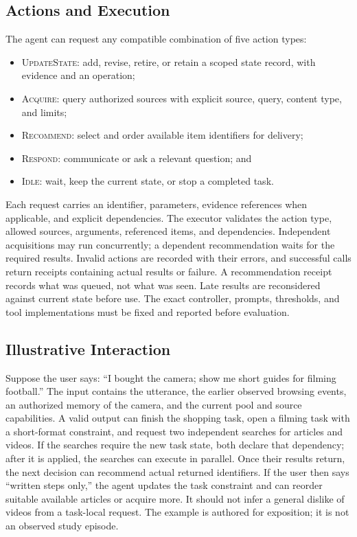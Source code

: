 \documentclass[11pt]{article}
\begin{document}
\subsection{Actions and Execution}
The agent can request any compatible combination of five action types:
\begin{itemize}
\item \textsc{UpdateState}: add, revise, retire, or retain a scoped state record, with evidence and an operation;
\item \textsc{Acquire}: query authorized sources with explicit source, query, content type, and limits;
\item \textsc{Recommend}: select and order available item identifiers for delivery;
\item \textsc{Respond}: communicate or ask a relevant question; and
\item \textsc{Idle}: wait, keep the current state, or stop a completed task.
\end{itemize}
Each request carries an identifier, parameters, evidence references when applicable, and explicit dependencies. The executor validates the action type, allowed sources, arguments, referenced items, and dependencies. Independent acquisitions may run concurrently; a dependent recommendation waits for the required results. Invalid actions are recorded with their errors, and successful calls return receipts containing actual results or failure. A recommendation receipt records what was queued, not what was seen. Late results are reconsidered against current state before use. The exact controller, prompts, thresholds, and tool implementations must be fixed and reported before evaluation.

\subsection{Illustrative Interaction}
Suppose the user says: ``I bought the camera; show me short guides for filming football.'' The input contains the utterance, the earlier observed browsing events, an authorized memory of the camera, and the current pool and source capabilities. A valid output can finish the shopping task, open a filming task with a short-format constraint, and request two independent searches for articles and videos. If the searches require the new task state, both declare that dependency; after it is applied, the searches can execute in parallel. Once their results return, the next decision can recommend actual returned identifiers. If the user then says ``written steps only,'' the agent updates the task constraint and can reorder suitable available articles or acquire more. It should not infer a general dislike of videos from a task-local request. The example is authored for exposition; it is not an observed study episode.
\end{document}
